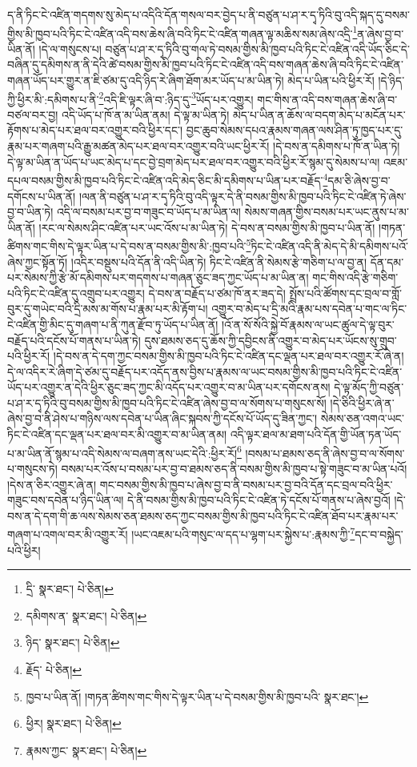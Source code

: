 ད་ནི་ཏིང་ངེ་འཛིན་གདགས་སུ་མེད་པ་འདིའི་དོན་གསལ་བར་བྱེད་པ་ནི་བཙུན་པ་ཤ་ར་དྭ་ཏིའི་བུ་འདི་སྐད་དུ་བསམ་གྱིས་མི་ཁྱབ་པའི་ཏིང་ངེ་འཛིན་འདི་བས་ཆེས་ཞི་བའི་ཏིང་ངེ་འཛིན་གཞན་ལྟ་མཆིས་སམ་ཞེས་འདྲི་\footnote{དྲི་  སྣར་ཐང་།  པེ་ཅིན། }ན་ཞེས་བྱ་བ་ཡིན་ནོ། །དེ་ལ་གསུངས་པ། བཙུན་པ་ཤ་ར་དྭ་ཏིའི་བུ་གལ་ཏེ་བསམ་གྱིས་མི་ཁྱབ་པའི་ཏིང་ངེ་འཛིན་འདི་ཡོད་ཅིང་དེ་བཞིན་དུ་དམིགས་ན་ནི་དེའི་ཚེ་བསམ་གྱིས་མི་ཁྱབ་པའི་ཏིང་ངེ་འཛིན་འདི་བས་གཞན་ཆེས་ཞི་བའི་ཏིང་ངེ་འཛིན་གཞན་ཡོད་པར་གྱུར་ན་ཇི་ཙམ་དུ་འདི་ཉིད་རེ་ཞིག་ཐོག་མར་ཡོད་པ་མ་ཡིན་ཏེ། མེད་པ་ཡིན་པའི་ཕྱིར་རོ། །དེ་ཉིད་ཀྱི་ཕྱིར་མི་:དམིགས་པ་ནི་\footnote{དམིགས་ན་  སྣར་ཐང་།  པེ་ཅིན། }འདི་ཇི་ལྟར་ཞི་བ་:ཉིད་དུ་\footnote{ཉིད་  སྣར་ཐང་།  པེ་ཅིན། }ཡོད་པར་འགྱུར། གང་གིས་ན་འདི་བས་གཞན་ཆེས་ཞི་བ་བཙལ་བར་བྱ། འདི་ཡོད་པ་ཁོ་ན་མ་ཡིན་ནམ། དེ་ལྟ་མ་ཡིན་ཏེ། མེད་པ་ཡིན་ན་ཆོས་ལ་བདག་མེད་པ་མངོན་པར་རྟོགས་པ་མེད་པར་ཐལ་བར་འགྱུར་བའི་ཕྱིར་དང་། བྱང་ཆུབ་སེམས་དཔའ་རྣམས་གཞན་ལས་ཤིན་ཏུ་ཁྱད་པར་དུ་རྣམ་པར་གཞག་པའི་རྒྱུ་མཚན་མེད་པར་ཐལ་བར་འགྱུར་བའི་ཡང་ཕྱིར་རོ། །དེ་བས་ན་དམིགས་པ་ཁོ་ན་ཡིན་ཏེ། དེ་ལྟ་མ་ཡིན་ན་ཡོད་པ་ཡང་མེད་པ་དང་བྱེ་བྲག་མེད་པར་ཐལ་བར་འགྱུར་བའི་ཕྱིར་རོ་སྙམ་དུ་སེམས་པ་ལ། འཇམ་དཔལ་བསམ་གྱིས་མི་ཁྱབ་པའི་ཏིང་ངེ་འཛིན་འདི་མེད་ཅིང་མི་དམིགས་པ་ཡིན་པར་བརྗོད་\footnote{རྗོད་  པེ་ཅིན། }དམ་ཅི་ཞེས་བྱ་བ་དགོངས་པ་ཡིན་ནོ། །ལན་ནི་བཙུན་པ་ཤ་ར་དྭ་ཏིའི་བུ་འདི་ལྟར་དེ་ནི་བསམ་གྱིས་མི་ཁྱབ་པའི་ཏིང་ངེ་འཛིན་ཏེ་ཞེས་བྱ་བ་ཡིན་ཏེ། འདི་ལ་བསམ་པར་བྱ་བ་གཟུང་བ་ཡོད་པ་མ་ཡིན་ལ། སེམས་གཞན་གྱིས་བསམ་པར་ཡང་ནུས་པ་མ་ཡིན་ནོ། །རང་ལ་སེམས་ཤིང་འཛིན་པར་ཡང་འོས་པ་མ་ཡིན་ཏེ། དེ་བས་ན་བསམ་གྱིས་མི་ཁྱབ་པ་ཡིན་ནོ། །གཏན་ཚིགས་གང་གིས་དེ་ལྟར་ཡིན་པ་དེ་བས་ན་བསམ་གྱིས་མི་:ཁྱབ་པའི་\footnote{ཁྱབ་པ་ཡིན་ནོ། །གཏན་ཚིགས་གང་གིས་དེ་ལྟར་ཡིན་པ་དེ་བསམ་གྱིས་མི་ཁྱབ་པའི་  སྣར་ཐང་། }ཏིང་ངེ་འཛིན་འདི་ནི་མེད་དེ་མི་དམིགས་པའོ་ཞེས་ཀྱང་སྟོན་ཏོ། །འདིར་བསྡུས་པའི་དོན་ནི་འདི་ཡིན་ཏེ། ཏིང་ངེ་འཛིན་ནི་སེམས་རྩེ་གཅིག་པ་ལ་བྱ་ན། དོན་དམ་པར་སེམས་ཀྱི་རྩེ་མོ་དམིགས་པར་གདགས་པ་གཞན་ཅུང་ཟད་ཀྱང་ཡོད་པ་མ་ཡིན་ན། གང་གིས་འདི་རྩེ་གཅིག་པའི་ཏིང་ངེ་འཛིན་དུ་འགྲུབ་པར་འགྱུར། དེ་བས་ན་བརྗོད་པ་ཙམ་ཁོ་ནར་ཟད་དེ། སྤྲོས་པའི་ཚོགས་དང་བྲལ་བ་གློ་བུར་དུ་གཡེང་བའི་དྲི་མས་མ་གོས་པ་རྣམ་པར་མི་རྟོག་པ། འགྱུར་བ་མེད་པ་དྲི་མའི་རྣམ་པས་དབེན་པ་གང་ལ་ཏིང་ངེ་འཛིན་གྱི་མིང་དུ་གཞག་པ་ནི་ཀུན་རྫོབ་ཏུ་ཡོད་པ་ཡིན་ནོ། །འོ་ན་སོ་སོའི་སྐྱེ་བོ་རྣམས་ལ་ཡང་ཚུལ་དེ་ལྟ་བུར་བརྗོད་པའི་དངོས་པོ་གནས་པ་ཡིན་ཏེ། དུས་ཐམས་ཅད་དུ་ཆོས་ཀྱི་དབྱིངས་ནི་འགྱུར་བ་མེད་པར་ཡོངས་སུ་གྲུབ་པའི་ཕྱིར་རོ། །དེ་བས་ན་དེ་དག་ཀྱང་བསམ་གྱིས་མི་ཁྱབ་པའི་ཏིང་ངེ་འཛིན་དང་ལྡན་པར་ཐལ་བར་འགྱུར་རོ་ཞེ་ན། དེ་ལ་འདིར་རེ་ཞིག་དེ་ཙམ་དུ་བརྗོད་པར་འདོད་ནས་བྱིས་པ་རྣམས་ལ་ཡང་བསམ་གྱིས་མི་ཁྱབ་པའི་ཏིང་ངེ་འཛིན་ཡོད་པར་འགྱུར་ན་དེའི་ཕྱིར་ཅུང་ཟད་ཀྱང་མི་འདོད་པར་འགྱུར་བ་མ་ཡིན་པར་དགོངས་ནས། དེ་ལྟ་མོད་ཀྱི་བཙུན་པ་ཤ་ར་དྭ་ཏིའི་བུ་བསམ་གྱིས་མི་ཁྱབ་པའི་ཏིང་ངེ་འཛིན་ཞེས་བྱ་བ་ལ་སོགས་པ་གསུངས་སོ། །དེ་ཅིའི་ཕྱིར་ཞེ་ན་ཞེས་བྱ་བ་ནི་ཤེས་པ་གཉིས་ལས་དབེན་པ་ཡིན་ཞིང་སྐབས་ཀྱི་དངོས་པོ་ཡོད་དུ་ཟིན་ཀྱང་། སེམས་ཅན་འགའ་ཡང་ཏིང་ངེ་འཛིན་དང་ལྡན་པར་ཐལ་བར་མི་འགྱུར་བ་མ་ཡིན་ནམ། འདི་ལྟར་ཐལ་མ་ཐག་པའི་དོན་གྱི་ཡོན་ཏན་ཡོད་པ་མ་ཡིན་ནོ་སྙམ་པ་འདི་སེམས་ལ་བཞག་ནས་ཡང་དེའི་:ཕྱིར་རོ།\footnote{ཕྱིར།  སྣར་ཐང་།  པེ་ཅིན། } །བསམ་པ་ཐམས་ཅད་ནི་ཞེས་བྱ་བ་ལ་སོགས་པ་གསུངས་ཏེ། བསམ་པར་འོས་པ་བསམ་པར་བྱ་བ་ཐམས་ཅད་ནི་བསམ་གྱིས་མི་ཁྱབ་པ་སྟེ་གཟུང་བ་མ་ཡིན་པའོ། །དེས་ན་ཅིར་འགྱུར་ཞེ་ན། གང་བསམ་གྱིས་མི་ཁྱབ་པ་ཞེས་བྱ་བ་ནི་བསམ་པར་བྱ་བའི་དོན་དང་བྲལ་བའི་ཕྱིར་གཟུང་བས་དབེན་པ་ཉིད་ཡིན་ལ། དེ་ནི་བསམ་གྱིས་མི་ཁྱབ་པའི་ཏིང་ངེ་འཛིན་ཏེ་དངོས་པོ་གནས་པ་ཞེས་བྱའོ། །དེ་བས་ན་དེ་དག་གི་ཆ་ལས་སེམས་ཅན་ཐམས་ཅད་ཀྱང་བསམ་གྱིས་མི་ཁྱབ་པའི་ཏིང་ངེ་འཛིན་ཐོབ་པར་རྣམ་པར་གཞག་པ་འགལ་བར་མི་འགྱུར་རོ། །ཡང་འཇམ་པའི་གསུང་ལ་དད་པ་ལྷག་པར་སྐྱེས་པ་:རྣམས་ཀྱི་\footnote{རྣམས་ཀྱང་  སྣར་ཐང་།  པེ་ཅིན། }དང་བ་བསྐྱེད་པའི་ཕྱིར། 